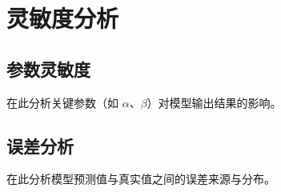 \section{灵敏度分析}


\subsection{参数灵敏度}

在此分析关键参数（如 $\alpha$、$\beta$）对模型输出结果的影响。

\subsection{误差分析}

在此分析模型预测值与真实值之间的误差来源与分布。
